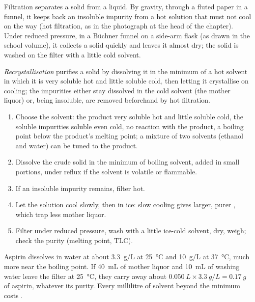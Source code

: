 Filtration separates a solid from a liquid. By gravity, through a fluted
paper in a funnel, it keeps back an insoluble impurity from a hot solution
that must not cool on the way (hot filtration, as in the photograph at the
head of the chapter). Under reduced pressure, in a Büchner funnel on a
side-arm flask (as drawn in the school volume), it collects a solid
quickly and leaves it almost dry; the solid is washed on the filter with a
little cold solvent.

\begin{definition}[Recrystallisation]\label{def:b1:lab-techniques-1:recrystallisation}
\emph{Recrystallisation} purifies a solid by
dissolving it in the minimum of a hot solvent in which it is very soluble
hot and little soluble cold, then letting it crystallise on cooling; the
impurities either stay dissolved in the cold solvent (the mother liquor)
or, being insoluble, are removed beforehand by hot filtration.
\end{definition}

\begin{method}\label{met:b1:lab-techniques-1:recrystallise}
\begin{enumerate}
  \item Choose the solvent: the product very soluble hot and little
        soluble cold, the soluble impurities soluble even cold, no
        reaction with the product, a boiling point below the product's
        melting point; a mixture of two  solvents (ethanol and
        water) can be tuned to the product.
  \item Dissolve the crude solid in the minimum of boiling solvent, added
        in small portions, under reflux if the solvent is volatile or
        flammable.
  \item If an insoluble impurity remains, filter hot.
  \item Let the solution cool slowly, then in ice: slow cooling gives
        larger, purer , which trap less mother liquor.
  \item Filter under reduced pressure, wash with a little ice-cold
        solvent, dry, weigh; check the purity (melting point, TLC).
\end{enumerate}
\end{method}

\begin{example}
Aspirin dissolves in water at about \qty{3.3}{g/L} at \qty{25}{\celsius}
and \qty{10}{g/L} at \qty{37}{\celsius}, much more near the boiling
point. If \qty{40}{mL} of mother liquor and \qty{10}{mL} of washing water
leave the filter at \qty{25}{\celsius}, they carry away about
$\qty{0.050}{L} \times \qty{3.3}{g/L} = \qty{0.17}{g}$ of aspirin, whatever
its purity. Every millilitre of solvent beyond the minimum costs .
\end{example}

